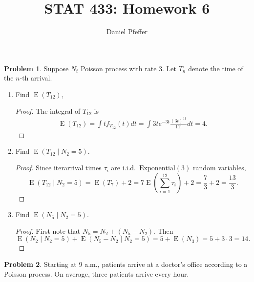 \documentclass[oneside]{amsart}
\title{STAT 433: Homework 6}
\author{Daniel Pfeffer}
\DeclareMathOperator{\E}{\mathrm{E}}
\newcommand{\Exp}{\mathrm{Exponential}}
\theoremstyle{definition}
\newtheorem{prob}{Problem}
\begin{document}
\maketitle

\begin{prob}
Suppose $N_t$ Poisson process with rate 3. Let $T_n$ denote the time of the $n$-th arrival.
\end{prob}

\begin{enumerate}
\item
Find $\E (T_{12})$, 
\begin{proof}
The integral of $T_{12}$ is
\begin{align*}
	\E (T_{12}) = \int t f_{T_{12}}(t) dt = \int 3te^{-3 t} \frac{(3t)^{11}}{11!} dt = 4.
\end{align*}
\end{proof}
\item
Find $\E(T_{12} \mid N_2 = 5)$.
\begin{proof}
Since iterarrival times $\tau_i$ are i.i.d.\ $\Exp(3)$ random variables,
\[
	\E(T_{12} \mid N_2 = 5) 
	= \E (T_7) + 2 
	= 7 \E\left(\sum_{i=1}^{12} \tau_i\right) + 2= \frac{7}{3} + 2 = \frac{13}{3}.
\]
\end{proof}
\item
Find $\E(N_5 \mid N_2 = 5)$. 
\begin{proof}
First note that $N_5 = N_2 + (N_5 - N_2)$. Then 
\[
	\E(N_2 \mid N_2 = 5) + \E(N_5 - N_2 \mid N_2 = 5) = 5 + \E (N_3) = 5 + 3 \cdot 3 = 14.
\]
\end{proof}
\end{enumerate}


\begin{prob}
Starting at 9 a.m., patients arrive at a doctor's office according to a Poisson process. On average, three patients arrive every hour.
\end{prob}
\end{document}
